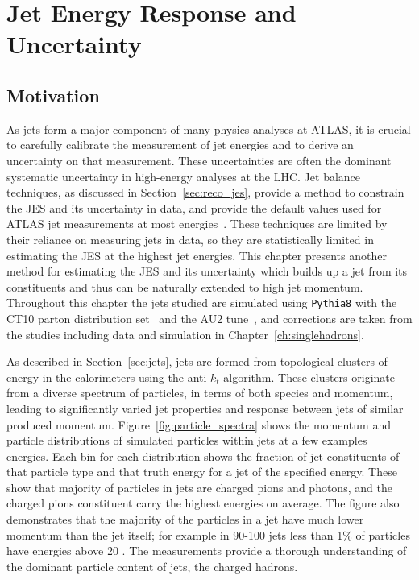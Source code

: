 \chapter{Jet Energy Response and Uncertainty}

\label{ch:jes}

\section{Motivation}

As jets form a major component of many physics analyses at ATLAS, it is crucial to carefully calibrate the measurement of jet energies and to derive an uncertainty on that measurement.
These uncertainties are often the dominant systematic uncertainty in high-energy analyses at the \ac{LHC}.
Jet  balance techniques, as discussed in Section~\ref{sec:reco_jes}, provide a method to constrain the \ac{JES} and its uncertainty in data, and provide the default values used for ATLAS jet measurements at most energies~\cite{PERF-2012-01}.
These techniques are limited by their reliance on measuring jets in data, so they are statistically limited in estimating the \acl{JES} at the highest jet energies.
This chapter presents another method for estimating the \acl{JES} and its uncertainty which builds up a jet from its constituents and thus can be naturally extended to high jet momentum.
Throughout this chapter the jets studied are simulated using \texttt{Pythia8} with the CT10 parton distribution set~\cite{CTEQ} and the AU2 tune~\cite{AU2}, and corrections are taken from the studies including data and simulation in Chapter~\ref{ch:singlehadrons}. 

As described in Section~\ref{sec:jets}, jets are formed from topological clusters of energy in the calorimeters using the anti-$k_t$ algorithm.
These clusters originate from a diverse spectrum of particles, in terms of both species and momentum, leading to significantly varied jet properties and response between jets of similar produced momentum.
Figure~\ref{fig:particle_spectra} shows the momentum and particle distributions of simulated particles within jets at a few examples energies.
Each bin for each distribution shows the fraction of jet constituents of that particle type and that truth energy for a jet of the specified energy.
These show that majority of particles in jets are charged pions and photons, and the charged pions constituent carry the highest energies on average.
The figure also demonstrates that the majority of the particles in a jet have much lower momentum than the jet itself; for example in 90-100 \GeV jets less than 1\% of particles have energies above 20 \GeV. 
The \ep measurements provide a thorough understanding of the dominant particle content of jets, the charged hadrons. 


